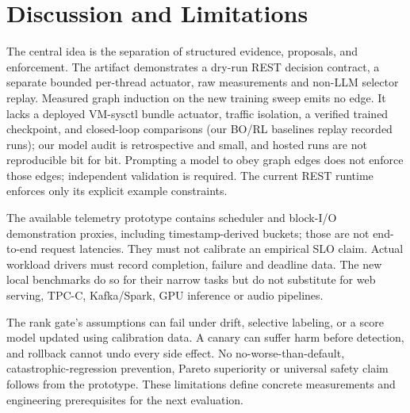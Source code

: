 \section{Discussion and Limitations}
\label{sec:discussion}
The central idea is the separation of structured evidence, proposals, and enforcement. The artifact demonstrates a dry-run REST decision contract, a separate bounded per-thread actuator, raw measurements and non-LLM selector replay. Measured graph induction on the new training sweep emits no edge. It lacks a deployed VM-sysctl bundle actuator, traffic isolation, a verified trained checkpoint, and closed-loop comparisons (our BO/RL baselines replay recorded runs); our model audit is retrospective and small, and hosted runs are not reproducible bit for bit. Prompting a model to obey graph edges does not enforce those edges; independent validation is required. The current REST runtime enforces only its explicit example constraints.

The available telemetry prototype contains scheduler and block-I/O demonstration proxies, including timestamp-derived buckets; those are not end-to-end request latencies. They must not calibrate an empirical SLO claim. Actual workload drivers must record completion, failure and deadline data. The new local benchmarks do so for their narrow tasks but do not substitute for web serving, TPC-C, Kafka/Spark, GPU inference or audio pipelines.

The rank gate's assumptions can fail under drift, selective labeling, or a score model updated using calibration data. A canary can suffer harm before detection, and rollback cannot undo every side effect. No no-worse-than-default, catastrophic-regression prevention, Pareto superiority or universal safety claim follows from the prototype. These limitations define concrete measurements and engineering prerequisites for the next evaluation.
